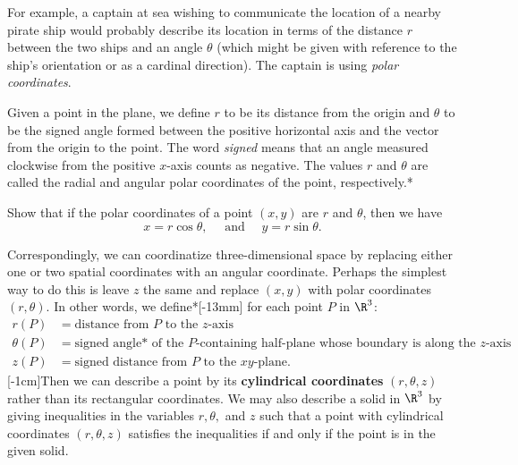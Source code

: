 \documentclass{watsonbook}
\begin{document}
For example, a captain at sea wishing to communicate the location of a
nearby pirate ship would probably describe its location in terms of
the distance $r$ between the two ships and an angle $\theta$ (which
might be given with reference to the ship's orientation or as a
cardinal direction). The captain is using \textit{polar coordinates}. 

Given a point in the plane, we define $r$ to be its distance from the
origin and $\theta$ to be the signed angle formed between the positive
horizontal axis and the vector from the origin to the point. The word
\textit{signed} means that an angle measured clockwise from the
positive $x$-axis counts as negative. The values $r$ and $\theta$ are
called the radial and angular polar coordinates of the point,
respectively.* 

\begin{exercise}{}{}
  Show that if the polar coordinates of a point $(x,y)$ are $r$ and
  $\theta$, then we have
  \[
    x = r\cos \theta, \quad \text { and } \quad y  = r\sin \theta. 
  \]
\end{exercise}

Correspondingly, we can coordinatize three-dimensional space by
replacing either one or two spatial coordinates with an angular
coordinate. Perhaps the simplest way to do this is leave $z$ the same
and replace $(x,y)$ with polar coordinates $(r,\theta)$. In other
words, we define*[-13mm] for each point
$P$ in $\R^3$:
\begin{align*}
  r(P) &= \text{distance from $P$ to the }z\text{-axis} \\
  \theta(P) &= \text{signed angle* of the $P$-containing half-plane
              whose boundary is along the $z$-axis} \\ 
  z(P) &= \text{signed distance from $P$ to the }xy\text{-plane}. 
\end{align*} [-1cm]Then we can describe a point by its
\textbf{cylindrical coordinates} $(r,\theta, z)$ rather than its
rectangular coordinates. We may also describe a solid in $\R^3$
by giving inequalities in the variables $r, \theta,$ and $z$ such that
a point with cylindrical coordinates
$(r,\theta,z)$
satisfies the inequalities if and only if the point is in the given solid. 
\end{document}
